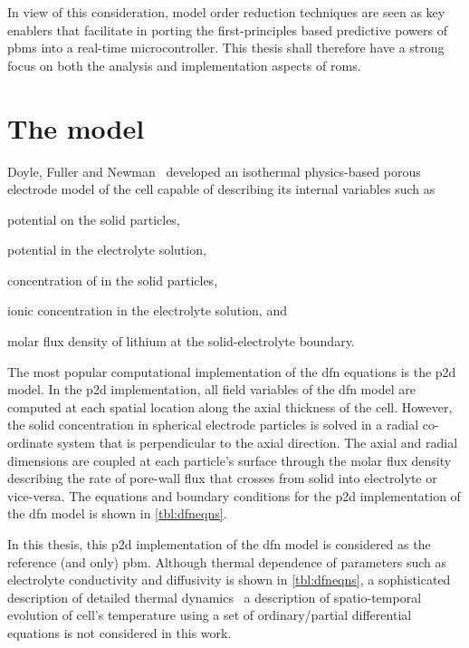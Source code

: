 In view of this consideration, model  order reduction techniques are seen as key
enablers that facilitate in porting the first-principles based predictive powers
of \glspl{pbm}  into a  real-time microcontroller.  This thesis  shall therefore
have  a  strong  focus  on  both the  analysis  and  implementation  aspects  of
\glspl{rom}.

\section{The  model}\label{sec:dfnmodel}

Doyle,  Fuller and  Newman~\cite{Doyle1993,Fuller1994}  developed an  isothermal
physics-based  porous electrode  model of  the  cell capable  of describing  its
internal variables such as
\begin{enumerate*}[label=\itshape\alph*\upshape)]
    \item potential on the solid particles,
    \item potential in the electrolyte solution,
    \item concentration of  in the solid particles,
    \item ionic concentration in the electrolyte solution, and
    \item molar flux density of lithium at the solid-electrolyte boundary.
\end{enumerate*}
The most popular computational implementation  of the \gls{dfn} equations is the
\gls{p2d} model.  In the  \gls{p2d} implementation, all  field variables  of the
\gls{dfn} model are  computed at each spatial location  along the axial
thickness of the  cell. However, the solid concentration  in spherical electrode
particles is solved in a radial  co-ordinate system that is perpendicular to the
axial direction. The axial and radial  dimensions are coupled at each particle's
surface through  the molar flux  density describing  the rate of  pore-wall flux
that  crosses from  solid  into  electrolyte or  vice-versa.  The equations  and
boundary conditions for  the \gls{p2d} implementation of the  \gls{dfn} model is
shown in \cref{tbl:dfneqns}.



In  this  thesis,  this  \gls{p2d}  implementation of  the  \gls{dfn}  model  is
considered as  the reference (and  only) \gls{pbm}. Although  thermal dependence
of  parameters  such  as  electrolyte  conductivity  and  diffusivity  is  shown
in \cref{tbl:dfneqns}, a sophisticated description  of detailed thermal dynamics
\ie~a description  of spatio-temporal evolution of cell's  temperature using a
set of ordinary/partial  differential equations is not considered  in this work.

